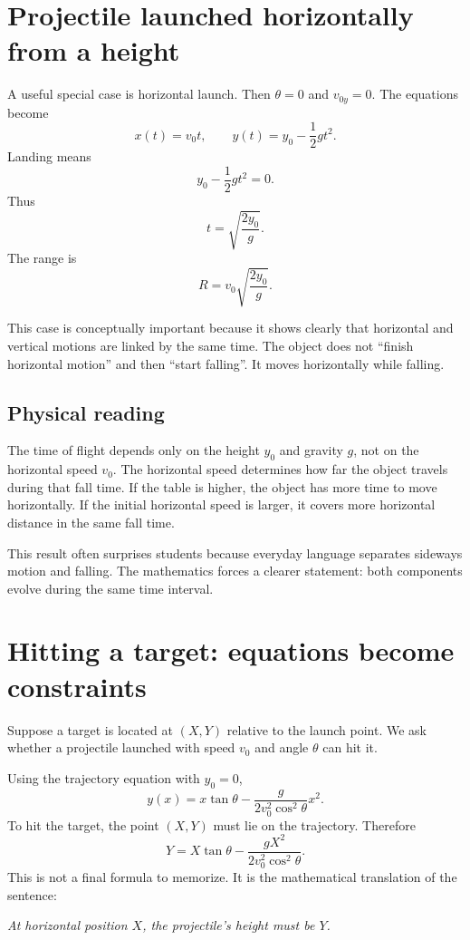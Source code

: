 \documentclass[11pt,a4paper]{article}
\begin{document}
\section{Projectile launched horizontally from a height}

A useful special case is horizontal launch. Then $\theta=0$ and $v_{0y}=0$. The equations become
\[
x(t)=v_0t,
\qquad
 y(t)=y_0-\frac12gt^2.
\]
Landing means
\[
y_0-\frac12gt^2=0.
\]
Thus
\[
t=\sqrt{\frac{2y_0}{g}}.
\]
The range is
\[
R=v_0\sqrt{\frac{2y_0}{g}}.
\]

This case is conceptually important because it shows clearly that horizontal and vertical motions are linked by the same time. The object does not ``finish horizontal motion'' and then ``start falling''. It moves horizontally while falling.

\subsection{Physical reading}

The time of flight depends only on the height $y_0$ and gravity $g$, not on the horizontal speed $v_0$. The horizontal speed determines how far the object travels during that fall time. If the table is higher, the object has more time to move horizontally. If the initial horizontal speed is larger, it covers more horizontal distance in the same fall time.

This result often surprises students because everyday language separates sideways motion and falling. The mathematics forces a clearer statement: both components evolve during the same time interval.

\newpage

\section{Hitting a target: equations become constraints}

Suppose a target is located at $(X,Y)$ relative to the launch point. We ask whether a projectile launched with speed $v_0$ and angle $\theta$ can hit it.

Using the trajectory equation with $y_0=0$,
\[
y(x)=x\tan\theta-\frac{g}{2v_0^2\cos^2\theta}x^2.
\]
To hit the target, the point $(X,Y)$ must lie on the trajectory. Therefore
\[
Y=X\tan\theta-\frac{gX^2}{2v_0^2\cos^2\theta}.
\]
This is not a final formula to memorize. It is the mathematical translation of the sentence:

\emph{At horizontal position $X$, the projectile's height must be $Y$.}
\end{document}
